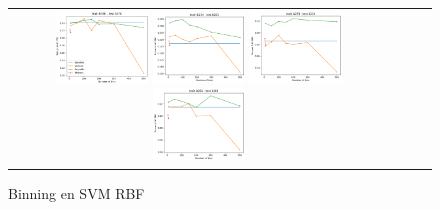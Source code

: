 \begin{figure}[h!]
\begin{tabular}{cccc}
  \includegraphics[width=0.25\textwidth]{Kap4/kFigure_9.png} \includegraphics[width=0.25\textwidth]{Kap4/kFigure_10.png}
  \includegraphics[width=0.25\textwidth]{Kap4/kFigure_11.png} \includegraphics[width=0.25\textwidth]{Kap4/kFigure_12.png} 
\end{tabular}
\caption{Binning en SVM RBF}
\label{fig:svmk_binning}
\end{figure}

